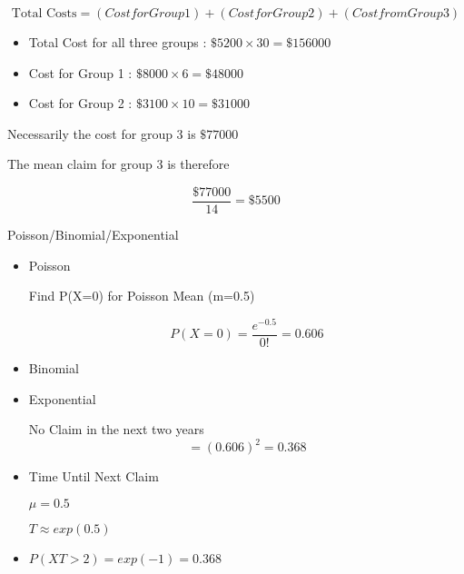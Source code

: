 \documentclass[]{report}
\begin{document}
{\[\mbox{Total Costs} = (Cost for Group 1) + (Cost for Group 2) + (Cost from Group 3)\]

\begin{itemize}
\item Total Cost for all three groups : $\$5200 \times 30 = \$156000$
\item Cost for Group 1 : $\$8000 \times 6 = \$48000$
\item Cost for Group 2 : $\$3100 \times 10 = \$31000$
\end{itemize}

Necessarily the cost for group 3 is $\$77000$

The mean claim for group 3 is therefore

\[ \frac{\$77000}{14} = \$5500 \]


Poisson/Binomial/Exponential

\begin{itemize}
\item  Poisson

Find P(X=0) for Poisson Mean (m=0.5)


\[ P(X=0) = \frac{e^{-0.5}}{0!}  = 0.606 \]


\item Binomial




\item Exponential

No Claim in the next two years
\[= (0.606)^2 = 0.368\]


\item Time Until Next Claim

$\mu= 0.5$

$T \approx exp(0.5)$

\item$P(XT >2) = exp(-1) = 0.368$

\end{itemize}









}
\end{document}
